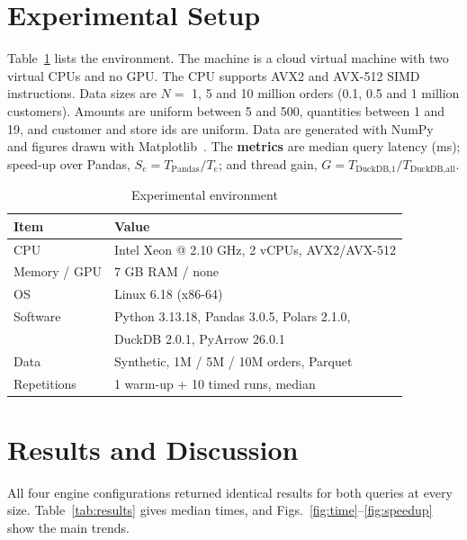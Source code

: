 \documentclass[conference,a4paper]{IEEEtran}
\begin{document}
\section{Experimental Setup}\label{sec:setup}
Table~\ref{tab:setup} lists the environment. The machine is a cloud virtual machine with two virtual CPUs and no GPU. The CPU supports AVX2 and AVX-512 SIMD instructions. Data sizes are $N = $ 1, 5 and 10 million orders (0.1, 0.5 and 1 million customers). Amounts are uniform between 5 and 500, quantities between 1 and 19, and customer and store ids are uniform. Data are generated with NumPy~\cite{harris20} and figures drawn with Matplotlib~\cite{hunter07}. The \textbf{metrics} are median query latency (ms); speed-up over Pandas, $S_e = T_{\text{Pandas}} / T_e$; and thread gain, $G = T_{\text{DuckDB,1}} / T_{\text{DuckDB,all}}$.

\begin{table}[t]
\centering
\caption{Experimental environment}
\label{tab:setup}
\footnotesize
\begin{tabular}{@{}ll@{}}
\toprule
\textbf{Item} & \textbf{Value} \\
\midrule
CPU & Intel Xeon @ 2.10 GHz, 2 vCPUs, AVX2/AVX-512 \\
Memory / GPU & 7 GB RAM / none \\
OS & Linux 6.18 (x86-64) \\
Software & Python 3.13.18, Pandas 3.0.5, Polars 2.1.0, \\
 & DuckDB 2.0.1, PyArrow 26.0.1 \\
Data & Synthetic, 1M / 5M / 10M orders, Parquet \\
Repetitions & 1 warm-up + 10 timed runs, median \\
\bottomrule
\end{tabular}
\end{table}

\section{Results and Discussion}\label{sec:results}
All four engine configurations returned identical results for both queries at every size. Table~\ref{tab:results} gives median times, and Figs.~\ref{fig:time}--\ref{fig:speedup} show the main trends.
\end{document}
